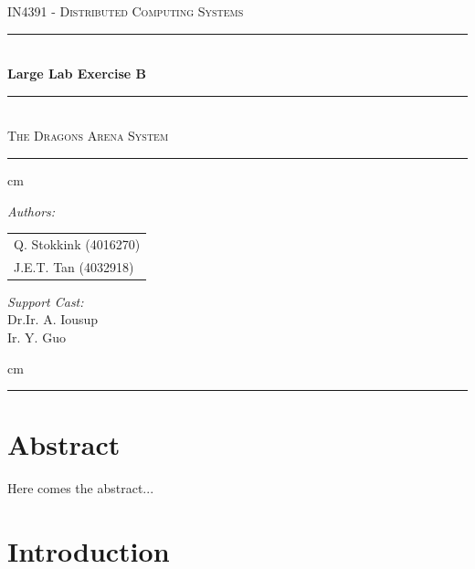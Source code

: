 \documentclass[a4paper,10pt]{article}
\begin{document}
\begin{titlepage}
			\begin{center}
			\textsc{\LARGE {IN4391 - Distributed Computing Systems}}\\[1cm]
			\rule{\linewidth}{0.5mm} \\[0.4cm]

			{\Huge \bfseries Large Lab Exercise B}\\[0.15cm]

			\rule{\linewidth}{0.5mm} \\
			\textsc{\large{The Dragons Arena System}}
			
				\rule{\linewidth}{0.5mm}
			
			 cm
			
			\begin{minipage}{0.4\textwidth}
				\begin{flushleft} \large
					\emph{Authors:}\\
					\begin{tabular}{l}
						Q. Stokkink (4016270) \\
						J.E.T. Tan (4032918)\\
					\end{tabular}
				\end{flushleft}
			\end{minipage}
			\hspace{1cm}
			\begin{minipage}{0.4\textwidth}
				\begin{flushright} \large
					\emph{Support Cast:} \\
					Dr.Ir. A. Iousup \\
					Ir. Y. Guo
				\end{flushright}
			\end{minipage}
			
			 cm
			
			\rule{\linewidth}{0.5mm}
			\end{center}
\end{titlepage}

\section{Abstract}
\label{sec:abstract}

Here comes the abstract...

\section{Introduction}
\label{sec:intro}
\end{document}
